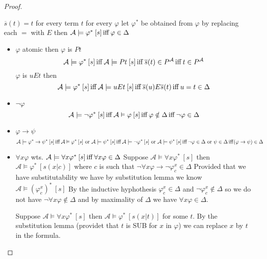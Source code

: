 \begin{proof}
\begin{enumerate}
         $\overline{s}(t) = t$ for every term $t$
         for every $\varphi$ let $\varphi^*$ be obtained from $\varphi$ by replacing each $=$ with $E$ then $\mathcal{A}\models \varphi^* \: [s] \operatorname{iff} \varphi \in \Delta$
        \begin{claimproof}
            \begin{itemize}
                \item $\varphi$ atomic then $\varphi$ is $Pt$\\
                \[\mathcal{A}\models \varphi^* \: [s] \operatorname{iff} \mathcal{A}\models Pt \: [s] \operatorname{iff} \overline{s}(t)\in P^\mathcal{A} \operatorname{iff} t\in P^\mathcal{A}\]
                $\varphi$ is $uEt$ then
                \[\mathcal{A}\models \varphi^* \: [s] \operatorname{iff} \mathcal{A}\models uEt \: [s] \operatorname{iff} \overline{s}(u)E\overline{s}(t)\operatorname{iff} u=t\in \Delta\]
                \item $\lnot \varphi$
                \[\mathcal{A}\models \lnot\varphi^* \: [s] \operatorname{iff} \mathcal{A}\vDash \varphi \: [s] \operatorname{iff} \varphi\notin \Delta \operatorname{iff} \lnot \varphi \in \Delta\]
                \item $\varphi \to \psi$
                \[\mathcal{A}\models \varphi^*\to \psi^* \: [s] \operatorname{iff} \mathcal{A}\vDash \varphi^* \: [s] \text{ or }\mathcal{A}\models \psi^* \: [s] \operatorname{iff} \mathcal{A}\models \lnot \varphi^* \: [s] \text{ or }\mathcal{A}\models \psi^* \: [s] \operatorname{iff} \lnot \varphi \in \Delta \text{ or } \psi\in \Delta \operatorname{iff} (\varphi \to \psi)\in \Delta\]
                \item $\forall x \varphi$
                wts. $\mathcal{A}\models \forall x \varphi^* \: [s] \operatorname{iff} \forall x \varphi \in \Delta$
                Suppose $\mathcal{A}\models \forall x \varphi^* \: [s]$ then $\mathcal{A}\models \varphi^* \: [s(x|c)]$ where $c$ is such that $\lnot \forall x \varphi \to \lnot \varphi^x_c\in \Delta$
                Provided that we have substitutability we have by substitution lemma %
                we know $\mathcal{A} \models (\varphi^x_c)^*\: [s]$
                By the inductive hyphothesis $\varphi^x_c\in \Delta$ and $\lnot\varphi_c^x\notin \Delta$ 
                so we do not have $\lnot \forall x \varphi\notin \Delta$ and by maximality of $\Delta$ we have 
                $ \forall x \varphi \in \Delta$.

                Suppose $\mathcal{A}\vDash \forall x \varphi^* \: [s]$ then $\mathcal{A}\vDash \varphi^* \: [s(x|t)]$ for some $t$. By the substitution lemma (providet that $t$ is SUB for $x$ in $\varphi$) we can replace $x$ by $t$ in the formula.


\end{itemize}
\end{claimproof}
\end{enumerate}
\end{proof}
